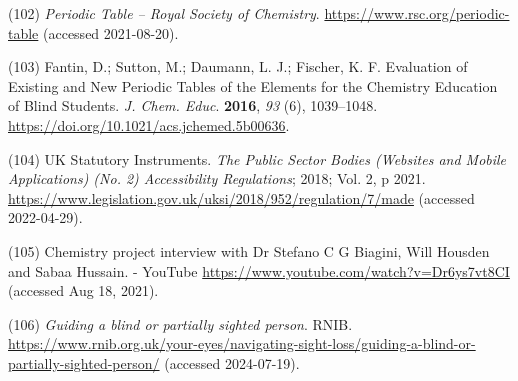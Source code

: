 \documentclass[11.5pt]{sig-alternate} %
\begin{document}
(102)	\textit{Periodic Table – Royal Society of Chemistry}. \url{https://www.rsc.org/periodic-table} (accessed 2021-08-20).

(103)	Fantin, D.; Sutton, M.; Daumann, L. J.; Fischer, K. F. Evaluation of Existing and New Periodic Tables of the Elements for the Chemistry Education of Blind Students. \textit{J. Chem. Educ}. \textbf{2016}, \textit{93} (6), 1039–1048. \url{https://doi.org/10.1021/acs.jchemed.5b00636}.

(104)	UK Statutory Instruments. \textit{The Public Sector Bodies (Websites and Mobile Applications) (No. 2) Accessibility Regulations}; 2018; Vol. 2, p 2021. \url{https://www.legislation.gov.uk/uksi/2018/952/regulation/7/made} (accessed 2022-04-29).

(105)	Chemistry project interview with Dr Stefano C G Biagini, Will Housden and Sabaa Hussain. - YouTube \url{https://www.youtube.com/watch?v=Dr6ys7vt8CI} (accessed Aug 18, 2021).

(106)	\textit{Guiding a blind or partially sighted person}. RNIB. \url{https://www.rnib.org.uk/your-eyes/navigating-sight-loss/guiding-a-blind-or-partially-sighted-person/} (accessed 2024-07-19).
\end{document}
